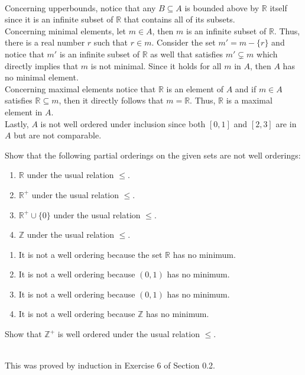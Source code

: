 \begin{solution}
    \\ Concerning upperbounds, notice that any $B \subseteq A$ is bounded above by $\mathbb{R}$ itself since it is an infinite subset of $\mathbb{R}$ that contains all of its subsets.\\
    Concerning minimal elements, let $m \in A$, then $m$ is an infinite subset of $\mathbb{R}$. Thus, there is a real number $r$ such that $r \in m$. Consider the set $m' = m - \{r\}$ and notice that $m'$ is an infinite subset of $\mathbb{R}$ as well that satisfies $m' \subsetneq m$ which directly implies that $m$ is not minimal. Since it holds for all $m$ in $A$, then $A$ has no minimal element. \\
    Concerning maximal elements notice that $\mathbb{R}$ is an element of $A$ and if $m \in A$ satisfies $\mathbb{R} \subseteq m$, then it directly follows that $m = \mathbb{R}$. Thus, $\mathbb{R}$ is a maximal element in $A$.\\
    Lastly, $A$ is not well ordered under inclusion since both $[0,1]$ and $[2,3]$ are in $A$ but are not comparable.\\
\end{solution}

\begin{exercise}
    Show that the following partial orderings on the given sets are not well orderings:
    \begin{enumerate}[label = \textbf{(\alph*)}]
        \item $\mathbb{R}$ under the usual relation $\leq$.
        \item $\mathbb{R}^+$ under the usual relation $\leq$.
        \item $\mathbb{R}^+ \cup \{0\}$ under the usual relation $\leq$.
        \item $\mathbb{Z}$ under the usual relation $\leq$.\\
    \end{enumerate}
\end{exercise}

\begin{solution}
    \begin{enumerate}[label = \textbf{(\alph*)}]
        \item It is not a well ordering because the set $\mathbb{R}$ has no minimum.
        \item It is not a well ordering because $(0,1)$ has no minimum.
        \item It is not a well ordering because $(0,1)$ has no minimum.
        \item It is not a well ordering because $\mathbb{Z}$ has no minimum. \\
    \end{enumerate}
\end{solution}

\begin{exercise}
    Show that $\mathbb{Z}^+$ is well ordered under the usual relation $\leq$. \\
\end{exercise}

\begin{solution}
    \\ This was proved by induction in Exercise 6 of Section 0.2.
\end{solution}